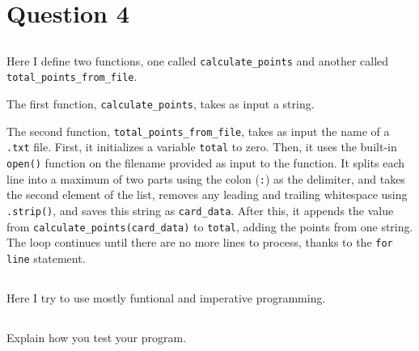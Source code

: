 \documentclass{article}
\begin{document}
\section{Question 4}
\subsection{}


Here I define two functions, one called \texttt{calculate\_points} and another called \texttt{total\_points\_from\_file}.

The first function, \texttt{calculate\_points}, takes as input a string.

The second function, \texttt{total\_points\_from\_file}, takes as input the name of a \texttt{.txt} file. First, it initializes a variable \texttt{total} to zero. Then, it uses the built-in \texttt{open()} function on the filename provided as input to the function. It splits each line into a maximum of two parts using the colon (\texttt{:}) as the delimiter, and takes the second element of the list, removes any leading and trailing whitespace using \texttt{.strip()}, and saves this string as \texttt{card\_data}. After this, it appends the value from \texttt{calculate\_points(card\_data)} to \texttt{total}, adding the points from one string. The loop continues until there are no more lines to process, thanks to the \texttt{for line} statement.

\subsection{}

Here I try to use mostly funtional and imperative programming.  

\subsection{}


Explain how you test your program.


\section{}




\subsection{}


\end{document}
